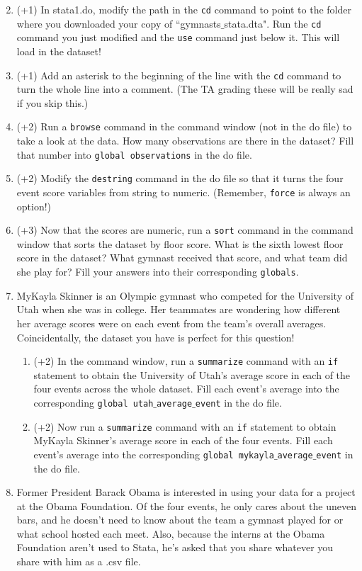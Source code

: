 \documentclass[12pt, oneside]{article}
\begin{document}
\begin{enumerate}
\setcounter{enumi}{1}
\item	(+1)	In stata1.do, modify the path in the \texttt{cd} command to point to the folder where you downloaded your copy of ``gymnasts$\_$stata.dta". Run the \texttt{cd} command you just modified and the \texttt{use} command just below it. This will load in the dataset! 
\item   (+1)    Add an asterisk to the beginning of the line with the \texttt{cd} command to turn the whole line into a comment. (The TA grading these will be really sad if you skip this.)
\item   (+2)    Run a \texttt{browse} command in the command window (not in the do file) to take a look at the data. How many observations are there in the dataset? Fill that number into \texttt{global observations} in the do file.
\item   (+2)    Modify the \texttt{destring} command in the do file so that it turns the four event score variables from string to numeric. (Remember, \texttt{force} is always an option!)
\item   (+3)    Now that the scores are numeric, run a \texttt{sort} command in the command window that sorts the dataset by floor score. What is the sixth lowest floor score in the dataset? What gymnast received that score, and what team did she play for? Fill your answers into their corresponding \texttt{globals}.
\item   MyKayla Skinner is an Olympic gymnast who competed for the University of Utah when she was in college. Her teammates are wondering how different her average scores were on each event from the team's overall averages. Coincidentally, the dataset you have is perfect for this question!
\begin{enumerate}
    \item (+2) In the command window, run a \texttt{summarize} command with an \texttt{if} statement to obtain the University of Utah's average score in each of the four events across the whole dataset. Fill each event's average into the corresponding \texttt{global utah$\_$average$\_$event} in the do file.
    \item (+2) Now run a \texttt{summarize} command with an \texttt{if} statement to obtain MyKayla Skinner's average score in each of the four events. Fill each event's average into the corresponding \texttt{global mykayla$\_$average$\_$event} in the do file.
\end{enumerate}
\item    Former President Barack Obama is interested in using your data for a project at the Obama Foundation. Of the four events, he only cares about the uneven bars, and he doesn't need to know about the team a gymnast played for or what school hosted each meet. Also, because the interns at the Obama Foundation aren't used to Stata, he's asked that you share whatever you share with him as a .csv file.

\end{enumerate}
\end{document}
